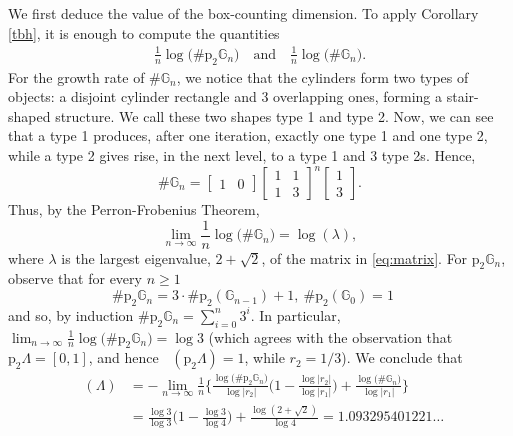 \documentclass[a4paper, 11pt]{article}
\DeclareMathOperator{\dB}{\dim_{\mathrm{B}}}
\numberwithin{equation}{section}
\theoremstyle{plain}
\theoremstyle{remark}
\theoremstyle{definition}
\begin{document}
We first deduce the value of the box-counting dimension. To apply Corollary \ref{tbh}, it is enough to compute the quantities
\begin{align*}
 \frac{1}{n}\log\big(\#\mathrm{p}_2\mathbb{G}_n\big) \quad \text{and}\quad \frac{1}{n}\log\big(\#\mathbb{G}_n\big).
\end{align*}
For the growth rate of $\#\mathbb{G}_n$, we notice that the cylinders form two types of objects: a disjoint cylinder rectangle and 3 overlapping ones, forming a stair-shaped structure. We call these two shapes type 1 and type 2. Now, we can see that a type 1 produces, after one iteration, exactly one type 1 and one type 2, while a type 2 gives rise, in the next level, to a type 1 and 3 type 2s. Hence,
\begin{equation} \label{eq:matrix}
\#\mathbb{G}_n =
\begin{bmatrix}
1 & 0
\end{bmatrix}
\begin{bmatrix}
1 & 1 \\
1 & 3
\end{bmatrix}^n
\begin{bmatrix}
1\\
3
\end{bmatrix}.
\end{equation}
Thus, by the Perron-Frobenius Theorem, 
\[\lim_{n\to\infty}\frac{1}{n}\log \big(\#\mathbb{G}_n \big) = \log(\lambda),\]
where $\lambda$ is the largest eigenvalue, $2+\sqrt{2}$, of the matrix in \eqref{eq:matrix}. For $\mathrm{p}_2\mathbb{G}_n$, observe that for every $n\geq1$
\begin{equation*}
\#\mathrm{p}_2\mathbb{G}_n = 3\cdot \#\mathrm{p}_2(\mathbb{G}_{n-1}) + 1,\ \#\mathrm{p}_2(\mathbb{G}_0) = 1\quad 
\end{equation*}
and so, by induction $\#\mathrm{p}_2\mathbb{G}_n = \sum_{i = 0}^n3^i$. In particular, $\lim_{n\to\infty}\frac{1}{n}\log\big(\#\mathrm{p}_2\mathbb{G}_n\big)=\log3$ (which agrees with the observation that $\mathrm{p}_2\Lambda = [0,1]$, and hence $\dB(\mathrm{p}_2\Lambda) = 1$, while $r_2 = 1/3$).
We conclude that
\begin{equation*}\begin{aligned}
\dB(\Lambda) &= -\lim_{n \to \infty}\frac{1}{n}\Bigg\{\frac{\log\big(\#\mathrm{p}_2\mathbb{G}_n\big)}{\log|r_2|}\Big(1 - \frac{\log |r_2|}{\log |r_1|}\Big) + \frac{\log \big(\#\mathbb{G}_n\big)}{\log |r_1|}\Bigg\} \\
&= \frac{\log3}{\log3}\Big(1 - \frac{\log 3}{\log 4}\Big) + \frac{\log(2+\sqrt{2})}{\log 4} = 1.093295401221 \dots
\end{aligned}\end{equation*}
\end{document}
